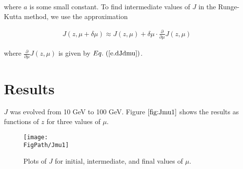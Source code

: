 \documentclass[floatfix,aps,prd,nofootinbib,superscriptaddress,preprint]{revtex4}
\newcommand*{\FigPath}{./figures}%
\newcommand\3[1]{\boldsymbol{#1}}
\newcommand{\eref}[1]{Eq.~(\ref{e.#1})}
\begin{document}
where $a$ is some small constant. To find intermediate values of $J$ in the Runge-Kutta method, we use the approximation 

\begin{align*}
	J(z, \mu + \delta\mu) \approx J(z, \mu) + \delta\mu \cdot \frac{\partial}{\partial \mu} J(z, \mu)
\end{align*}

where $\frac{\partial}{\partial \mu} J(z, \mu)$ is given by $\eref{dJdmu}$.

\section{Results}

$J$ was evolved from 10 GeV to 100 GeV. Figure $\ref{fig:Jmu1}$ shows the results as functions of $z$ for three values of $\mu$.

\begin{figure}
	\centering
 	\texttt{[image: \\FigPath/Jmu1]}
  	\caption{Plots of $J$ for initial, intermediate, and final values of $\mu$.}
  	\label{fig:Jmu1}
\end{figure}
\end{document}
